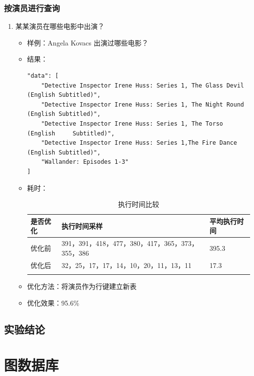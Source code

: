 \documentclass{ctexrep}
\begin{document}
	\subsubsection{按演员进行查询}
	    \begin{enumerate}
	        \item 某某演员在哪些电影中出演？
    	        \begin{itemize}
    	            \item 样例：Angela Kovacs 出演过哪些电影？
    	            \item 结果：
						\begin{lstlisting}
"data": [
	"Detective Inspector Irene Huss: Series 1, The Glass Devil (English Subtitled)",
	"Detective Inspector Irene Huss: Series 1, The Night Round (English Subtitled)",
	"Detective Inspector Irene Huss: Series 1, The Torso (English     Subtitled)",
	"Detective Inspector Irene Huss: Series 1,The Fire Dance (English Subtitled)",
	"Wallander: Episodes 1-3"
]
    	                \end{lstlisting}
    	            \item 耗时：
    	                \begin{longtable}{l|p{5cm}|l}
    	                    \hline
    	                    是否优化 & 执行时间采样 & 平均执行时间\\
    	                    \hline
    	                    \hline
    	                    优化前 & 391，391，418，477，380，417，365，373，355，386 & 395.3\\
    	                    优化后 & 32，25，17，17，14，10，20，11，13，11 & 17.3\\
    	                    \hline
    	                    \caption{执行时间比较}
    	                \end{longtable}
    	            \item 优化方法：将演员作为行键建立新表
    	            \item 优化效果：95.6\%
    	        \end{itemize}
	    \end{enumerate}
	\subsection{实验结论}
	
	\section{图数据库}
\end{document}
